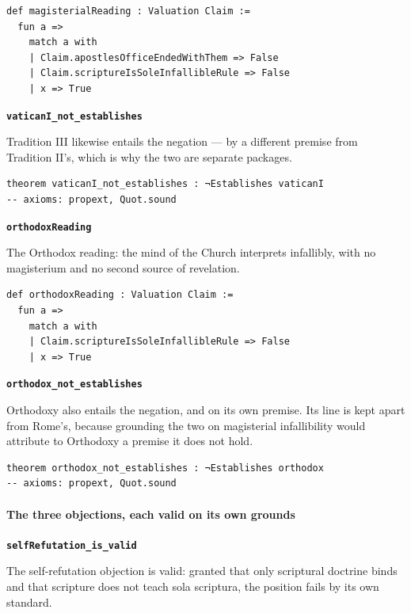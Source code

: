 \documentclass[11pt]{article}
\begin{document}
{\small\begin{verbatim}
def magisterialReading : Valuation Claim :=
  fun a =>
    match a with
    | Claim.apostlesOfficeEndedWithThem => False
    | Claim.scriptureIsSoleInfallibleRule => False
    | x => True
\end{verbatim}}
\par\medskip\noindent\textbf{\texttt{vatican\allowbreak{}I\_\allowbreak{}not\_\allowbreak{}establishes}}\par\nobreak\noindent
Tradition III likewise entails the negation — by a different premise from Tradition II’s, which is why the two are separate packages.

{\small\begin{verbatim}
theorem vaticanI_not_establishes : ¬Establishes vaticanI
-- axioms: propext, Quot.sound
\end{verbatim}}
\par\medskip\noindent\textbf{\texttt{orthodox\allowbreak{}Reading}}\par\nobreak\noindent
The Orthodox reading: the mind of the Church interprets infallibly, with no magisterium and no second source of revelation.

{\small\begin{verbatim}
def orthodoxReading : Valuation Claim :=
  fun a =>
    match a with
    | Claim.scriptureIsSoleInfallibleRule => False
    | x => True
\end{verbatim}}
\par\medskip\noindent\textbf{\texttt{orthodox\_\allowbreak{}not\_\allowbreak{}establishes}}\par\nobreak\noindent
Orthodoxy also entails the negation, and on its own premise. Its line is kept apart from Rome’s, because grounding the two on magisterial infallibility would attribute to Orthodoxy a premise it does not hold.

{\small\begin{verbatim}
theorem orthodox_not_establishes : ¬Establishes orthodox
-- axioms: propext, Quot.sound
\end{verbatim}}
\paragraph*{The three objections, each valid on its own grounds}
\leavevmode\par\nobreak
\par\medskip\noindent\textbf{\texttt{self\allowbreak{}Refutation\_\allowbreak{}is\_\allowbreak{}valid}}\par\nobreak\noindent
The self-refutation objection is valid: granted that only scriptural doctrine binds and that scripture does not teach sola scriptura, the position fails by its own standard.
\end{document}
